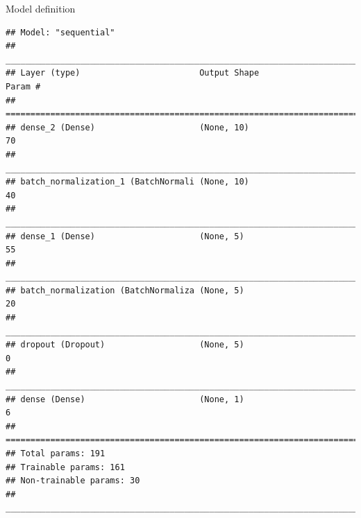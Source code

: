 \documentclass[12pt,ignorenonframetext,]{beamer}
\begin{document}
\begin{frame}[fragile]{Model definition}
\begin{verbatim}
## Model: "sequential"
## ________________________________________________________________________________
## Layer (type)                        Output Shape                    Param #     
## ================================================================================
## dense_2 (Dense)                     (None, 10)                      70          
## ________________________________________________________________________________
## batch_normalization_1 (BatchNormali (None, 10)                      40          
## ________________________________________________________________________________
## dense_1 (Dense)                     (None, 5)                       55          
## ________________________________________________________________________________
## batch_normalization (BatchNormaliza (None, 5)                       20          
## ________________________________________________________________________________
## dropout (Dropout)                   (None, 5)                       0           
## ________________________________________________________________________________
## dense (Dense)                       (None, 1)                       6           
## ================================================================================
## Total params: 191
## Trainable params: 161
## Non-trainable params: 30
## ________________________________________________________________________________
\end{verbatim}

\normalsize

\end{frame}
\end{document}

